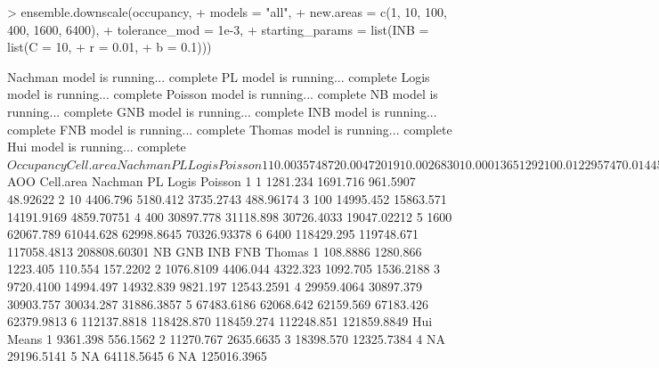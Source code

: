 \documentclass{article}[12pt, a4paper]
\begin{document}
\begin{Schunk}
\begin{Sinput}
> ensemble.downscale(occupancy,
+                    models = "all",
+                    new.areas = c(1, 10, 100, 400, 1600, 6400),
+                    tolerance_mod = 1e-3,
+                    starting_params = list(INB = list(C = 10,
+                                                      r = 0.01,
+                                                      b = 0.1)))
\end{Sinput}
\begin{Soutput}
Nachman model is running...  complete 
PL model is running...  complete 
Logis model is running...  complete 
Poisson model is running...  complete 
NB model is running...  complete 
GNB model is running...  complete 
INB model is running...  complete 
FNB model is running...  complete 
Thomas model is running...  complete 
Hui model is running...  complete 
$Occupancy
  Cell.area     Nachman          PL      Logis      Poisson
1         1 0.003574872 0.004720191 0.00268301 0.0001365129
2        10 0.012295747 0.014454274 0.01042208 0.0013642906
3       100 0.041839989 0.044262197 0.03959798 0.0135594518
4       400 0.086210319 0.086827282 0.08573215 0.0531445930
5      1600 0.173180215 0.170325414 0.17577808 0.1962247036
6      6400 0.330438881 0.334120174 0.32661407 0.5826132897
            NB         GNB         INB          FNB
1 0.0003038185 0.003573846 0.003413519 0.0003084653
2 0.0030044948 0.012293650 0.012060053 0.0030488420
3 0.0271216798 0.041837325 0.041665287 0.0274028922
4 0.0835920937 0.086209204 0.086227000 0.0838010248
5 0.1882913465 0.173182594 0.173436297 0.1874537560
6 0.3128847147 0.330437696 0.330522529 0.3131943391
        Thomas        Hui       Means
1 0.0004386724 0.02611997 0.001551775
2 0.0042863249 0.03144745 0.007353972
3 0.0349979327 0.05133530 0.034391011
4 0.0889687100         NA 0.081463488
5 0.1740512870         NA 0.178902245
6 0.3400108394         NA 0.348818071

$AOO
  Cell.area    Nachman         PL       Logis      Poisson
1         1   1281.234   1691.716    961.5907     48.92622
2        10   4406.796   5180.412   3735.2743    488.96174
3       100  14995.452  15863.571  14191.9169   4859.70751
4       400  30897.778  31118.898  30726.4033  19047.02212
5      1600  62067.789  61044.628  62998.8645  70326.93378
6      6400 118429.295 119748.671 117058.4813 208808.60301
           NB        GNB        INB        FNB      Thomas
1    108.8886   1280.866   1223.405    110.554    157.2202
2   1076.8109   4406.044   4322.323   1092.705   1536.2188
3   9720.4100  14994.497  14932.839   9821.197  12543.2591
4  29959.4064  30897.379  30903.757  30034.287  31886.3857
5  67483.6186  62068.642  62159.569  67183.426  62379.9813
6 112137.8818 118428.870 118459.274 112248.851 121859.8849
        Hui       Means
1  9361.398    556.1562
2 11270.767   2635.6635
3 18398.570  12325.7384
4        NA  29196.5141
5        NA  64118.5645
6        NA 125016.3965


\end{Soutput}
\end{Schunk}
\end{document}

